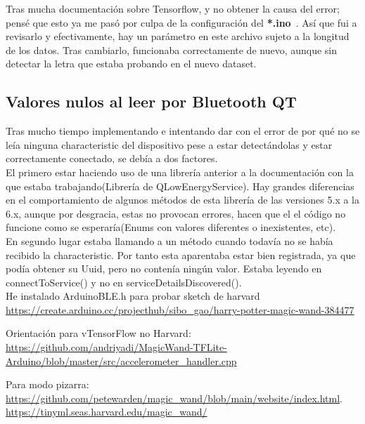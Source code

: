 \begin{mimargen}{-1cm}{-1cm}
Tras mucha documentación sobre Tensorflow, y no obtener la causa del error; pensé
que esto ya me pasó por culpa de la configuración del \small\textbf{*.ino}\normalsize~.
Así que fui a revisarlo y efectivamente, hay un parámetro en este archivo sujeto a
la longitud de los datos. Tras cambiarlo, funcionaba correctamente de nuevo, aunque
sin detectar la letra que estaba probando en el nuevo dataset.


\subsection{Valores nulos al leer por Bluetooth QT}
Tras mucho tiempo implementando e intentando dar con el error de por qué no se
leía ninguna characteristic del dispositivo pese a estar detectándolas y estar
correctamente conectado, se debía a dos factores.\\
El primero estar haciendo uso de una librería anterior a la documentación con
la que estaba trabajando(Librería de QLowEnergyService). Hay grandes diferencias
en el comportamiento de algunos métodos de esta librería de las versiones 5.x
a la 6.x, aunque por desgracia, estas no provocan errores, hacen que el
el código no funcione como se esperaría(Enums con valores diferentes o inexistentes, etc).\\
En segundo lugar estaba llamando a un método cuando todavía no se había recibido
la characteristic. Por tanto esta aparentaba estar bien registrada, ya que
podía obtener su Uuid, pero no contenía ningún valor.
Estaba leyendo en connectToService() y no en serviceDetailsDiscovered().\\

He instalado  ArduinoBLE.h para probar sketch de harvard\\
\url{https://create.arduino.cc/projecthub/sibo_gao/harry-potter-magic-wand-384477}


Orientación para vTensorFlow no Harvard:
\url{https://github.com/andriyadi/MagicWand-TFLite-Arduino/blob/master/src/accelerometer_handler.cpp}


Para modo pizarra:
\url{https://github.com/petewarden/magic_wand/blob/main/website/index.html}.
\url{https://tinyml.seas.harvard.edu/magic_wand/}


\end{mimargen}